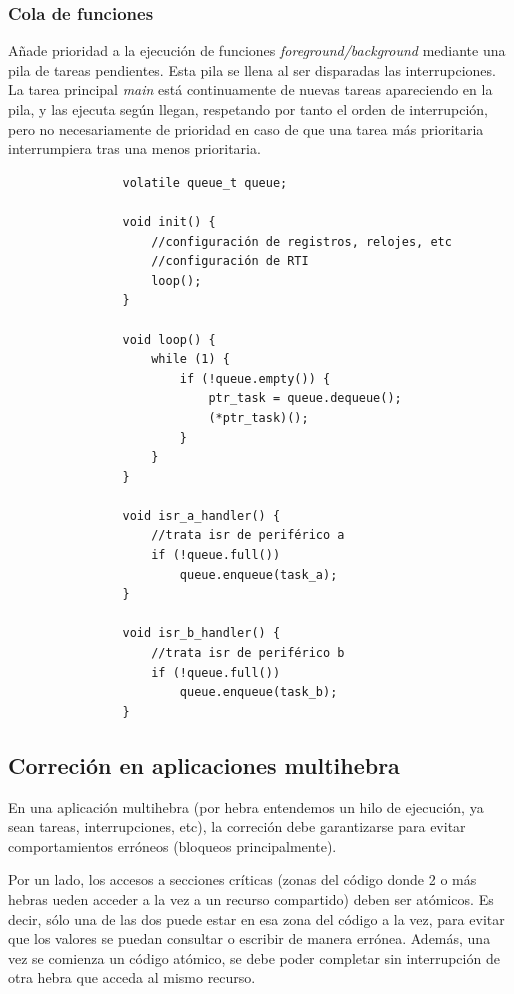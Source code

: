 \documentclass[../main.tex]{subfiles}
\begin{document}
        \subsubsection{Cola de funciones}
            
            Añade prioridad a la ejecución de funciones \emph{foreground/background} mediante una pila de tareas pendientes. Esta pila se llena al ser disparadas las interrupciones. La tarea principal \emph{main} está continuamente de nuevas tareas apareciendo en la pila, y las ejecuta según llegan, respetando por tanto el orden de interrupción, pero no necesariamente de prioridad en caso de que una tarea más prioritaria interrumpiera tras una menos prioritaria.

            \begin{lstlisting}
                volatile queue_t queue;

                void init() {
                    //configuración de registros, relojes, etc
                    //configuración de RTI
                    loop();
                }

                void loop() {
                    while (1) {
                        if (!queue.empty()) {
                            ptr_task = queue.dequeue();
                            (*ptr_task)();
                        }
                    }
                }

                void isr_a_handler() {
                    //trata isr de periférico a
                    if (!queue.full())
                        queue.enqueue(task_a);
                }

                void isr_b_handler() {
                    //trata isr de periférico b
                    if (!queue.full())
                        queue.enqueue(task_b);
                }
            \end{lstlisting}



    \subsection{Correción en aplicaciones multihebra}
        
        En una aplicación multihebra (por hebra entendemos un hilo de ejecución, ya sean tareas, interrupciones, etc), la correción debe garantizarse para evitar comportamientos erróneos (bloqueos principalmente).
        
        Por un lado, los accesos a secciones críticas (zonas del código donde 2 o más hebras ueden acceder a la vez a un recurso compartido) deben ser atómicos. Es decir, sólo una de las dos puede estar en esa zona del código a la vez, para evitar que los valores se puedan consultar o escribir de manera errónea. Además, una vez se comienza un código atómico, se debe poder completar sin interrupción de otra hebra que acceda al mismo recurso.
\end{document}
